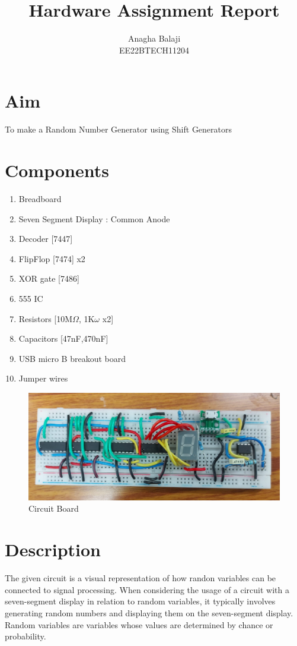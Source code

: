 \documentclass{article}
\begin{document}
\title{Hardware Assignment Report}
\author{Anagha Balaji \\ EE22BTECH11204}
\date{}
\maketitle

\section{Aim}
To make a Random Number Generator using Shift Generators

\section{Components}
\begin{enumerate}    
    \item Breadboard
    \item Seven Segment Display : Common Anode
    \item Decoder [7447]
    \item FlipFlop [7474] x2
    \item XOR gate [7486]
    \item 555 IC
    \item Resistors [10M$\Omega$, 1K$\omega$ x2]
    \item Capacitors [47nF,470nF]
    \item USB micro B breakout board
    \item Jumper wires
\end{enumerate}

\begin{figure}[ht]
        \centering
        \includegraphics[width=1\linewidth]{hardware.jpeg}
        \caption{Circuit Board}
        \label{fig:view}
\end{figure}

\section{Description}
The given circuit is a visual representation of how randon variables can be connected to signal processing.
When considering the usage of a circuit with a seven-segment display in relation to random variables, it typically involves generating random numbers and displaying them on the seven-segment display. Random variables are variables whose values are determined by chance or probability.
\end{document}
